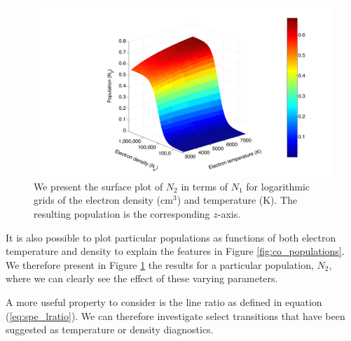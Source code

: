 %
\begin{figure}[h]
\centering
\includegraphics[scale=0.62, angle=0]{Figures/Cobalt/modelling/population2-v2}
\caption{We present the surface plot of $N_2$ in terms of $N_1$ for logarithmic grids of the electron density (cm$^3$) and temperature (K). The resulting population is the corresponding $z$-axis. \label{fig:co_pop2}}
\end{figure}
%
It is also possible to plot particular populations as functions of both electron temperature and density to explain the features in Figure \ref{fig:co_populations}. We therefore present in Figure \ref{fig:co_pop2} the results for a particular population, $N_2$, where we can clearly see the effect of these varying parameters. 

A more useful property to consider is the line ratio as defined in equation (\ref{eq:spe_lratio}). We can therefore investigate select transitions that have been suggested as temperature or density diagnostics. 

